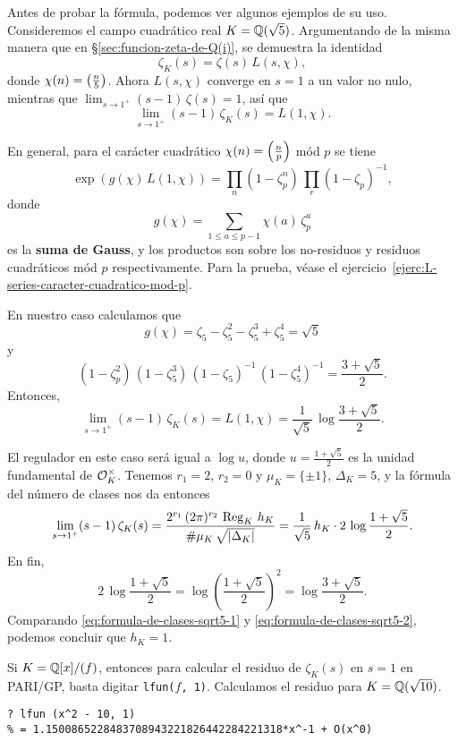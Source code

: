 Antes de probar la fórmula, podemos ver algunos ejemplos de su uso. Consideremos
el campo cuadrático real $K = \mathbb{Q} (\sqrt{5})$. Argumentando de la misma manera
que en \S\ref{sec:funcion-zeta-de-Q(i)}, se demuestra la identidad
$$\zeta_K (s) = \zeta (s) \, L (s,\chi),$$
donde $\chi (n) = \left(\frac{n}{5}\right)$.
Ahora $L (s,\chi)$ converge en $s = 1$ a un valor no nulo, mientras que
$\lim_{s\to 1^+} (s - 1)\,\zeta (s) = 1$, así que
$$\lim_{s \to 1^+} (s - 1)\,\zeta_K (s) = L (1,\chi).$$

En general, para el carácter cuadrático $\chi (n) = \left(\frac{n}{p}\right)$ mód $p$
se tiene
$$\exp (g (\chi)\,L (1,\chi)) = \prod_n (1 - \zeta_p^n)\,\prod_r (1 - \zeta_p)^{-1},$$
donde
$$g (\chi) = \sum_{1 \le a \le p-1} \chi (a)\,\zeta_p^a$$
es la \textbf{suma de Gauss}, y los productos son sobre los no-residuos y
residuos cuadráticos mód $p$ respectivamente. Para la prueba, véase
el ejercicio~\ref{ejerc:L-series-caracter-cuadratico-mod-p}.

En nuestro caso calculamos que
$$g (\chi) = \zeta_5 - \zeta_5^2 - \zeta_5^3 + \zeta_5^4 = \sqrt{5}$$
y
$$(1 - \zeta_p^2)\,(1 - \zeta_5^3)\,(1 - \zeta_5)^{-1}\,(1 - \zeta_5^4)^{-1} = \frac{3 + \sqrt{5}}{2}.$$
Entonces,
\begin{equation}
  \label{eq:formula-de-clases-sqrt5-1}
  \lim_{s \to 1^+} (s - 1)\,\zeta_K (s) =
  L (1, \chi) = \frac{1}{\sqrt{5}}\,\log\frac{3 + \sqrt{5}}{2}.
\end{equation}

El regulador en este caso será igual a $\log u$, donde
$u = \frac{1+\sqrt{5}}{2}$ es la unidad fundamental de $\mathcal{O}_K^\times$.
Tenemos $r_1 = 2$, $r_2 = 0$ y $\mu_K = \{ \pm 1 \}$, $\Delta_K = 5$, y la
fórmula del número de clases nos da entonces
\begin{equation}
  \label{eq:formula-de-clases-sqrt5-2}
  \lim_{s \to 1^+} (s - 1)\,\zeta_K (s) =
  \frac{2^{r_1}\,(2\pi)^{r_2}\,\operatorname{Reg}_K\,h_K}{\#\mu_K\,\sqrt{|\Delta_K|}} =
  \frac{1}{\sqrt{5}}\,h_K\cdot 2\,\log \frac{1+\sqrt{5}}{2}.
\end{equation}
En fin,
\[ 2\,\log \frac{1+\sqrt{5}}{2} =
   \log \left(\frac{1+\sqrt{5}}{2}\right)^2 =
   \log \frac{3+\sqrt{5}}{2}. \]
Comparando \eqref{eq:formula-de-clases-sqrt5-1} y
\eqref{eq:formula-de-clases-sqrt5-2}, podemos concluir que $h_K = 1$.

\vspace{1em}

Si $K = \mathbb{Q}[x]/(f)$, entonces para calcular el residuo de $\zeta_K (s)$ en
$s = 1$ en PARI/GP, basta digitar \texttt{lfun($f$, 1)}. Calculamos el residuo
para $K = \mathbb{Q} (\sqrt{10})$.
\begin{shaded}
\begin{verbatim}
? lfun (x^2 - 10, 1)
% = 1.1500865228483708943221826442284221318*x^-1 + O(x^0)
\end{verbatim}
\end{shaded}

